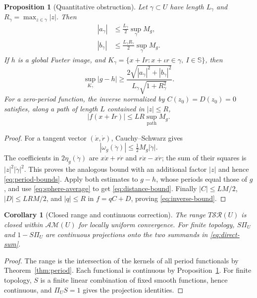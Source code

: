 \documentclass[11pt,a4paper]{article}
\numberwithin{equation}{section}
\newtheorem{proposition}[theorem]{Proposition}
\newtheorem{corollary}[theorem]{Corollary}
\theoremstyle{definition}
\theoremstyle{remark}
\newcommand{\SSS}{\mathbb S}
\newcommand{\ic}{\iota}
\newcommand{\SR}{\mathcal{SR}}
\newcommand{\AM}{\mathcal{AM}}
\begin{document}
\begin{proposition}[Quantitative obstruction]\label{prop:estimates}
Let $\gamma\subset U$ have length $L_\gamma$ and
$R_\gamma=\max_{z\in\gamma}|z|$. Then
\begin{align}
 |a_\gamma|&\le\frac{L_\gamma}{2}\sup_\gamma M_g,\\
 |b_\gamma|&\le\frac{L_\gamma R_\gamma}{2}\sup_\gamma M_g.
 \label{eq:period-bounds}
\end{align}
If $h$ is a global Fueter image, and
$K_\gamma=\{x+Ir:x+\ic r\in\gamma,\ I\in\SSS\}$, then
\begin{equation}
 \sup_{K_\gamma}|g-h|
 \ge\frac{2\sqrt{|a_\gamma|^2+|b_\gamma|^2}}
 {L_\gamma\sqrt{1+R_\gamma^2}}.
 \label{eq:distance-bound}
\end{equation}
For a zero-period function, the inverse normalized by $C(z_0)=D(z_0)=0$
satisfies, along a path of length $L$ contained in $|z|\le R$,
\begin{equation}
 |f(x+Ir)|\le LR\sup_{\text{path}}M_g.
 \label{eq:inverse-bound}
\end{equation}
\end{proposition}
\begin{proof}
For a tangent vector $(\dot x,\dot r)$, Cauchy--Schwarz gives
\[
 |\omega_g(\dot\gamma)|\le\tfrac12 M_g|\dot\gamma|.
\]
The coefficients in $2\eta_g(\dot\gamma)$ are
$x\dot x+r\dot r$ and $r\dot x-x\dot r$; the sum of their squares is
$|z|^2|\dot\gamma|^2$. This proves the analogous bound with an additional
factor $|z|$ and hence \eqref{eq:period-bounds}.
Apply both estimates to $g-h$, whose periods equal those of $g$, and use
\eqref{eq:sphere-average} to get \eqref{eq:distance-bound}.
Finally $|C|\le LM/2$, $|D|\le LRM/2$, and $|q|\le R$ in
$f=qC+D$, proving \eqref{eq:inverse-bound}.
\end{proof}

\begin{corollary}[Closed range and continuous correction]\label{cor:closed}
The range $T\SR(U)$ is closed within $\AM(U)$ for locally uniform
convergence. For finite topology, $S\Pi_U$ and $1-S\Pi_U$ are continuous
projections onto the two summands in \eqref{eq:direct-sum}.
\end{corollary}
\begin{proof}
The range is the intersection of the kernels of all period functionals by
Theorem~\ref{thm:period}. Each functional is continuous by
Proposition~\ref{prop:estimates}. For finite topology, $S$ is a finite linear
combination of fixed smooth functions, hence continuous, and
$\Pi_U S=1$ gives the projection identities.
\end{proof}
\end{document}
